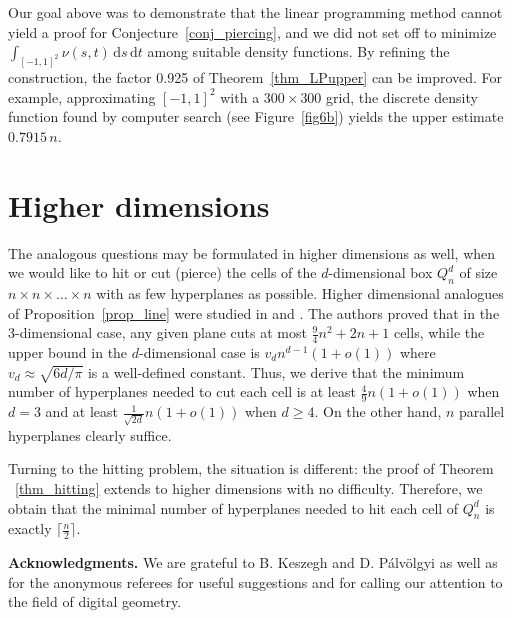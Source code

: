 \documentclass[11pt,a4paper]{amsart}
\newcommand{\dd}{\,\mathrm{d}}
\begin{document}
Our goal above was to demonstrate that the linear programming method cannot yield a proof for Conjecture~\ref{conj_piercing}, and we did not set off to minimize $\int_{[-1,1]^2} \nu(s,t) \dd s \dd t$ among suitable density functions. By refining the construction, the factor 0.925 of Theorem~\ref{thm_LPupper} can be improved. For example, approximating $[-1,1]^2$ with a $300\times 300$ grid, the discrete density function found by computer search  (see Figure~\ref{fig6b}) yields the upper estimate $0.7915 \, n$.


\section{Higher dimensions}
The analogous questions may be formulated in higher dimensions as well, when we would like to hit or cut (pierce) the cells of the $d$-dimensional box $Q_n^d$ of size $n \times n \times \ldots \times n$ with as few hyperplanes as possible. Higher dimensional analogues of Proposition~\ref{prop_line} were studied in \cite{BF21} and \cite{BF21+}. The authors proved that in the 3-dimensional case, any given plane cuts at most $\frac 9 4 n^2 + 2n +1$ cells, while the upper bound in the $d$-dimensional case is $v_d n^{d-1} (1 + o(1))$ where $v_d \approx \sqrt{6 d /\pi}$ is a well-defined constant. Thus, we derive that the minimum number of hyperplanes needed to cut each cell is at least $\frac 4 9 n (1 + o(1))$ when $d=3$ and at least $\frac 1 {\sqrt{2d}} n (1 + o(1))$ when $d \geq 4$. On the other hand, $n$ parallel hyperplanes clearly suffice.

Turning to the hitting problem, the situation is different: the proof of Theorem ~\ref{thm_hitting} extends to higher dimensions with no difficulty. Therefore, we obtain that the minimal number of hyperplanes needed to hit each cell of $Q_n^d$ is exactly $\lceil \frac n 2 \rceil$.


\medskip
{\bf Acknowledgments.} We are grateful to B. Keszegh and D. Pálvölgyi as well as for the anonymous referees for useful suggestions and for calling our attention to the field of digital geometry. 
\end{document}
